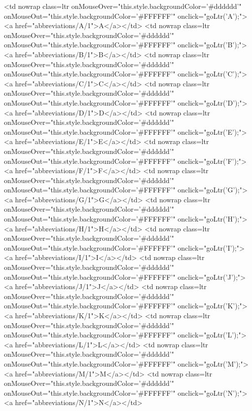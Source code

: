 {					
					<td nowrap class=ltr onMouseOver="this.style.backgroundColor='#dddddd'" onMouseOut="this.style.backgroundColor='#FFFFFF'" onclick="goLtr('A');"><a href="abbreviations/A/1">A</a></td>
					<td nowrap class=ltr onMouseOver="this.style.backgroundColor='#dddddd'" onMouseOut="this.style.backgroundColor='#FFFFFF'" onclick="goLtr('B');"><a href="abbreviations/B/1">B</a></td>
					<td nowrap class=ltr onMouseOver="this.style.backgroundColor='#dddddd'" onMouseOut="this.style.backgroundColor='#FFFFFF'" onclick="goLtr('C');"><a href="abbreviations/C/1">C</a></td>
					<td nowrap class=ltr onMouseOver="this.style.backgroundColor='#dddddd'" onMouseOut="this.style.backgroundColor='#FFFFFF'" onclick="goLtr('D');"><a href="abbreviations/D/1">D</a></td>
					<td nowrap class=ltr onMouseOver="this.style.backgroundColor='#dddddd'" onMouseOut="this.style.backgroundColor='#FFFFFF'" onclick="goLtr('E');"><a href="abbreviations/E/1">E</a></td>
					<td nowrap class=ltr onMouseOver="this.style.backgroundColor='#dddddd'" onMouseOut="this.style.backgroundColor='#FFFFFF'" onclick="goLtr('F');"><a href="abbreviations/F/1">F</a></td>
					<td nowrap class=ltr onMouseOver="this.style.backgroundColor='#dddddd'" onMouseOut="this.style.backgroundColor='#FFFFFF'" onclick="goLtr('G');"><a href="abbreviations/G/1">G</a></td>
					<td nowrap class=ltr onMouseOver="this.style.backgroundColor='#dddddd'" onMouseOut="this.style.backgroundColor='#FFFFFF'" onclick="goLtr('H');"><a href="abbreviations/H/1">H</a></td>
					<td nowrap class=ltr onMouseOver="this.style.backgroundColor='#dddddd'" onMouseOut="this.style.backgroundColor='#FFFFFF'" onclick="goLtr('I');"><a href="abbreviations/I/1">I</a></td>
					<td nowrap class=ltr onMouseOver="this.style.backgroundColor='#dddddd'" onMouseOut="this.style.backgroundColor='#FFFFFF'" onclick="goLtr('J');"><a href="abbreviations/J/1">J</a></td>
					<td nowrap class=ltr onMouseOver="this.style.backgroundColor='#dddddd'" onMouseOut="this.style.backgroundColor='#FFFFFF'" onclick="goLtr('K');"><a href="abbreviations/K/1">K</a></td>
					<td nowrap class=ltr onMouseOver="this.style.backgroundColor='#dddddd'" onMouseOut="this.style.backgroundColor='#FFFFFF'" onclick="goLtr('L');"><a href="abbreviations/L/1">L</a></td>
					<td nowrap class=ltr onMouseOver="this.style.backgroundColor='#dddddd'" onMouseOut="this.style.backgroundColor='#FFFFFF'" onclick="goLtr('M');"><a href="abbreviations/M/1">M</a></td>
					<td nowrap class=ltr onMouseOver="this.style.backgroundColor='#dddddd'" onMouseOut="this.style.backgroundColor='#FFFFFF'" onclick="goLtr('N');"><a href="abbreviations/N/1">N</a></td>
}
